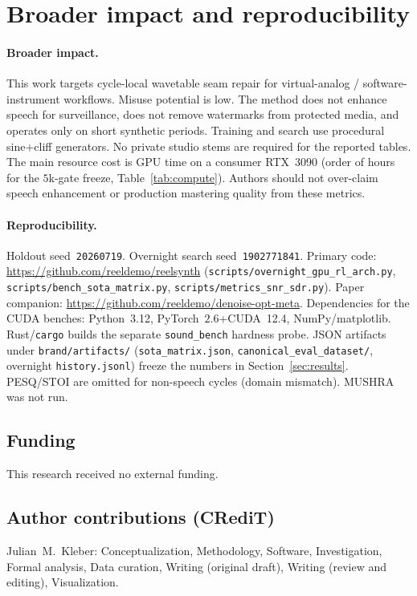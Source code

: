 \section{Broader impact and reproducibility}
\label{sec:ethics}

\paragraph{Broader impact.}
This work targets cycle-local wavetable seam repair for virtual-analog / software-instrument workflows.
Misuse potential is low. The method does not enhance speech for surveillance, does not remove watermarks from protected media, and operates only on short synthetic periods.
Training and search use procedural sine{+}cliff generators. No private studio stems are required for the reported tables.
The main resource cost is GPU time on a consumer RTX~3090 (order of hours for the $5$k-gate freeze, Table~\ref{tab:compute}).
Authors should not over-claim speech enhancement or production mastering quality from these metrics.

\paragraph{Reproducibility.}
Holdout seed~\texttt{20260719}. Overnight search seed~\texttt{1902771841}.
Primary code: \url{https://github.com/reeldemo/reelsynth} (\texttt{scripts/overnight\_gpu\_rl\_arch.py}, \texttt{scripts/bench\_sota\_matrix.py}, \texttt{scripts/metrics\_snr\_sdr.py}).
Paper companion: \url{https://github.com/reeldemo/denoise-opt-meta}.
Dependencies for the CUDA benches: Python~3.12, PyTorch~$2.6$+CUDA~12.4, NumPy/matplotlib. Rust/\texttt{cargo} builds the separate \texttt{sound\_bench} hardness probe.
JSON artifacts under \texttt{brand/artifacts/} (\texttt{sota\_matrix.json}, \texttt{canonical\_eval\_dataset/}, overnight \texttt{history.jsonl}) freeze the numbers in Section~\ref{sec:results}.
PESQ/STOI are omitted for non-speech cycles (domain mismatch). MUSHRA was not run.

\subsection{Funding}
\label{sec:funding}
This research received no external funding.

\subsection{Author contributions (CRediT)}
\label{sec:credit}
Julian~M.~Kleber: Conceptualization, Methodology, Software, Investigation, Formal analysis, Data curation, Writing (original draft), Writing (review and editing), Visualization.


